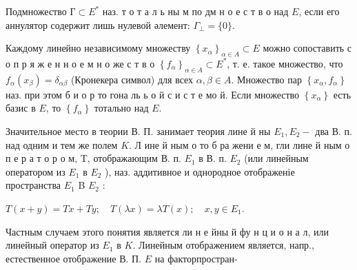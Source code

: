 \documentclass[10pt]{article}
\begin{document}
Подмножество $Г \subset E^{*}$ наз. т о т а л ь ны м по дм н о е с т в о над $E$, если его аннулятор содержит лишь нулевой әлемент: $\Gamma_{\perp}=\{0\}$.



Каждому линейно независимому множеству $\left\{x_{\alpha}\right\}_{\alpha \in A} \subset E$ можно сопоставить с о п р я ж е н н о е м н о же с т в о $\left\{f_{\alpha}\right\}_{\alpha \in A} \subset E^{*}$, т. е. такое множество, что $f_{\alpha}\left(x_{\beta}\right)=\delta_{\alpha \beta}$ (Кронекера символ) для всех $\alpha, \beta \in A$. Множество пар $\left\{x_{\alpha}, f_{\alpha}\right\}$ наз. при этом б и о р то гона ль ь о й с и с т е мо й. Если множество $\left\{x_{\alpha}\right\}$ есть базис в $E$, то $\left\{f_{\alpha}\right\}$ тотально над $E$.



Значительное место в теории В. П. занимает теория лине й ны $E_{1}, E_{2}-$ два В. п. над одним и тем же полем $K$. Л ине й ным о то б ра жени е м, гли лине й ным о п е р а т о р о м, T, отображающим В. п. $E_{1}$ в В. п. $E_{2}$ (или линейным оператором из $E_{1}$ в $E_{2}$ ), наз. аддитивное и однородное отображеніе пространства $E_{1}$ B $E_{2}$ :



$T(x+y)=T x+T y ; \quad T(\lambda x)=\lambda T(x) ; \quad x, y \in E_{1}$.



Частным случаем этого понятия является ли н е йны й фу н ц и о н а л, или линейный оператор из $E_{1}$ в $K$. Линейным отображением является, напр., естественное отображение В. П. $E$ на факторпростран-
\end{document}
